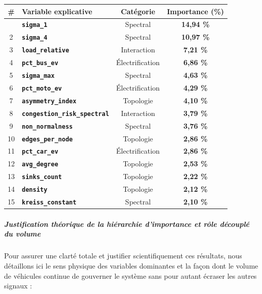 \documentclass[10pt, a4paper]{article}
\newcounter{none}
\begin{document}
{\def\LTcaptype{none} %
\begin{longtable}[]{@{}clcc@{}}
\toprule\noalign{}
\# & Variable explicative & Catégorie & Importance (\%) \\
\midrule\noalign{}
\endhead
\bottomrule\noalign{}
\endlastfoot
1 & \textbf{\texttt{sigma\_1}} & Spectral & \textbf{14,94 \%} \\
2 & \textbf{\texttt{sigma\_4}} & Spectral & \textbf{10,97 \%} \\
3 & \textbf{\texttt{load\_relative}} & Interaction & \textbf{7,21 \%} \\
4 & \textbf{\texttt{pct\_bus\_ev}} & Électrification & \textbf{6,86
\%} \\
5 & \textbf{\texttt{sigma\_max}} & Spectral & \textbf{4,63 \%} \\
6 & \textbf{\texttt{pct\_moto\_ev}} & Électrification & \textbf{4,29
\%} \\
7 & \textbf{\texttt{asymmetry\_index}} & Topologie & \textbf{4,10 \%} \\
8 & \textbf{\texttt{congestion\_risk\_spectral}} & Interaction &
\textbf{3,79 \%} \\
9 & \textbf{\texttt{non\_normalness}} & Spectral & \textbf{3,76 \%} \\
10 & \textbf{\texttt{edges\_per\_node}} & Topologie & \textbf{2,86
\%} \\
11 & \textbf{\texttt{pct\_car\_ev}} & Électrification & \textbf{2,86
\%} \\
12 & \textbf{\texttt{avg\_degree}} & Topologie & \textbf{2,53 \%} \\
13 & \textbf{\texttt{sinks\_count}} & Topologie & \textbf{2,22 \%} \\
14 & \textbf{\texttt{density}} & Topologie & \textbf{2,12 \%} \\
15 & \textbf{\texttt{kreiss\_constant}} & Spectral & \textbf{2,10 \%} \\
\end{longtable}
}

\subparagraph{Justification théorique de la hiérarchie d'importance et
rôle découplé du
volume}\label{justification-thuxe9orique-de-la-hiuxe9rarchie-dimportance-et-ruxf4le-duxe9coupluxe9-du-volume}

Pour assurer une clarté totale et justifier scientifiquement ces
résultats, nous détaillons ici le sens physique des variables dominantes
et la façon dont le volume de véhicules continue de gouverner le système
sans pour autant écraser les autres signaux :
\end{document}
